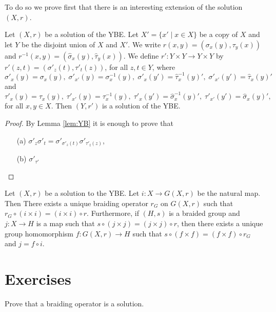 To do so we prove first that there is an interesting extension of the solution $(X,r)$.

\begin{proposition}
\label{prop:extendsol}
Let $(X,r)$ be a solution of the YBE. Let $X'=\{x'\mid x\in X\}$ be a copy of $X$ and let $Y$ be the disjoint union of $X$ and $X'$. We write $r(x,y)=(\sigma_x(y),\tau_y(x))$ and $r^{-1}(x,y)=(\widehat{\sigma}_x(y),\widehat{\tau}_y(x))$. We define $r'\colon Y\times Y\rightarrow Y\times Y$ by $r'(z,t)=(\sigma'_z(t),\tau'_t(z))$, for all $z,t\in Y$, where
\[ \sigma'_x(y)=\sigma_x(y),\; \sigma'_{x'}(y)=\sigma^{-1}_x(y),\; \sigma'_{x}(y')=\widehat{\tau}^{-1}_x(y)',\; \sigma'_{x'}(y')=\widehat{\tau}_x(y)'\]
and
\[ \tau'_x(y)=\tau_x(y),\; \tau'_{x'}(y)=\tau^{-1}_x(y),\; \tau'_{x}(y')=\widehat{\sigma}^{-1}_x(y)',\; \tau'_{x'}(y')=\widehat{\sigma}_x(y)',\]
for all $x,y\in X$. Then $(Y,r')$ is a solution of the YBE.
\end{proposition}

\begin{proof}
By Lemma \ref{lem:YB} it is enough to prove that
\begin{itemize}
    \item[(a)] $\sigma'_{z}\sigma'_{t}=\sigma'_{\sigma'_z(t)}\sigma'_{\tau'_t(z)}$,
    \item[(b)]$\sigma'_{\tau'}$
\end{itemize}
\end{proof}



\begin{theorem}
\label{thm:LYZ9}
Let $(X,r)$ be a solution to the YBE. Let $i\colon X\rightarrow G(X,r)$ be the natural map. Then There exists a unique braiding operator $r_G$ on $G(X,r)$ such that $r_G\circ (i\times i)=(i\times i)\circ r$. Furthermore, if $(H,s)$ is a braided group and $j\colon X\rightarrow H$ is a map such that
$s\circ (j\times j)=(j\times j)\circ r$, then there exists a unique group homomorphism $f\colon G(X,r)\rightarrow H$ such that $s\circ (f\times f)=(f\times f)\circ r_G$ and $j=f\circ i$.
\end{theorem}

\section*{Exercises}

\begin{prob}
Prove that a braiding operator is a solution. 
\end{prob}

